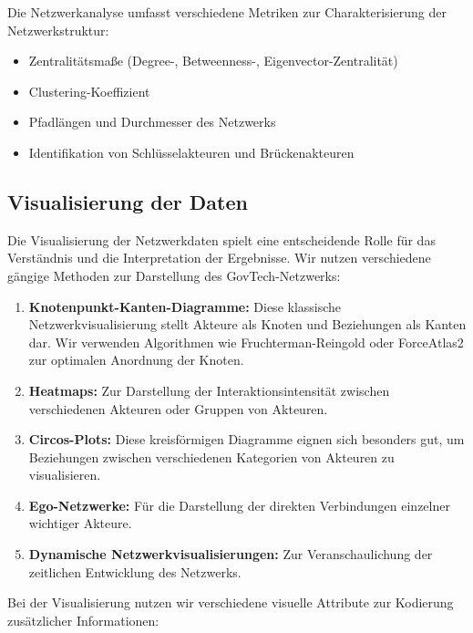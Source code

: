 \documentclass[a4paper,11pt]{article}
\begin{document}
Die Netzwerkanalyse umfasst verschiedene Metriken zur Charakterisierung der Netzwerkstruktur:

\begin{itemize}
    \item Zentralitätsmaße (Degree-, Betweenness-, Eigenvector-Zentralität)
    \item Clustering-Koeffizient
    \item Pfadlängen und Durchmesser des Netzwerks
    \item Identifikation von Schlüsselakteuren und Brückenakteuren
\end{itemize}


\subsection{Visualisierung der Daten}

Die Visualisierung der Netzwerkdaten spielt eine entscheidende Rolle für das Verständnis und die Interpretation der Ergebnisse. Wir nutzen verschiedene gängige Methoden zur Darstellung des GovTech-Netzwerks:

\begin{enumerate}
    \item \textbf{Knotenpunkt-Kanten-Diagramme:} Diese klassische Netzwerkvisualisierung stellt Akteure als Knoten und Beziehungen als Kanten dar. Wir verwenden Algorithmen wie Fruchterman-Reingold oder ForceAtlas2 zur optimalen Anordnung der Knoten.
    
    \item \textbf{Heatmaps:} Zur Darstellung der Interaktionsintensität zwischen verschiedenen Akteuren oder Gruppen von Akteuren.
    
    \item \textbf{Circos-Plots:} Diese kreisförmigen Diagramme eignen sich besonders gut, um Beziehungen zwischen verschiedenen Kategorien von Akteuren zu visualisieren.
    
    \item \textbf{Ego-Netzwerke:} Für die Darstellung der direkten Verbindungen einzelner wichtiger Akteure.
    
    \item \textbf{Dynamische Netzwerkvisualisierungen:} Zur Veranschaulichung der zeitlichen Entwicklung des Netzwerks.
\end{enumerate}

Bei der Visualisierung nutzen wir verschiedene visuelle Attribute zur Kodierung zusätzlicher Informationen:
\end{document}
